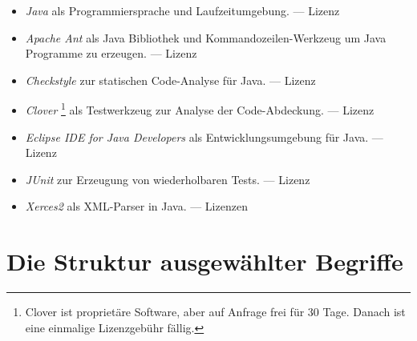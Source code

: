 \begin{itemize}
	\setcounter{enumi}{\value{Enumi}}%

	\item\label{Werkzeug:Java}\emph{Java} als Programmiersprache und Laufzeitumgebung.
	--- Lizenz 

	\item\label{Werkzeug:Apache Ant}\emph{Apache Ant} als Java Bibliothek und Kommandozeilen-Werkzeug
	um Java Programme zu erzeugen.
	--- Lizenz 

	\item\label{Werkzeug:Checkstyle}\emph{Checkstyle} zur statischen Code-Analyse für Java.
	--- Lizenz 

	\item\label{Werkzeug:Clover}\emph{Clover}%
	\footnote{%
		Clover ist proprietäre Software, aber auf Anfrage frei für 30 Tage.
		Danach ist eine einmalige Lizenzgebühr fällig.
	}
	als Testwerkzeug zur Analyse der Code-Abdeckung.
	--- Lizenz 

	\item\label{Werkzeug:Eclipse Java}\emph{Eclipse IDE for Java Developers} als Entwicklungsumgebung für Java.
	--- Lizenz 

	\item\label{Werkzeug:JUnit}\emph{JUnit} zur Erzeugung von wiederholbaren Tests.
	--- Lizenz 

	\item\label{Werkzeug:Xerces2}\emph{Xerces2} als XML-Parser in Java.
	--- Lizenzen 
\end{itemize}
\color{black}%

\section     {Die Struktur ausgewählter Begriffe}%
\label   {sec-Begriffsstruktur}

